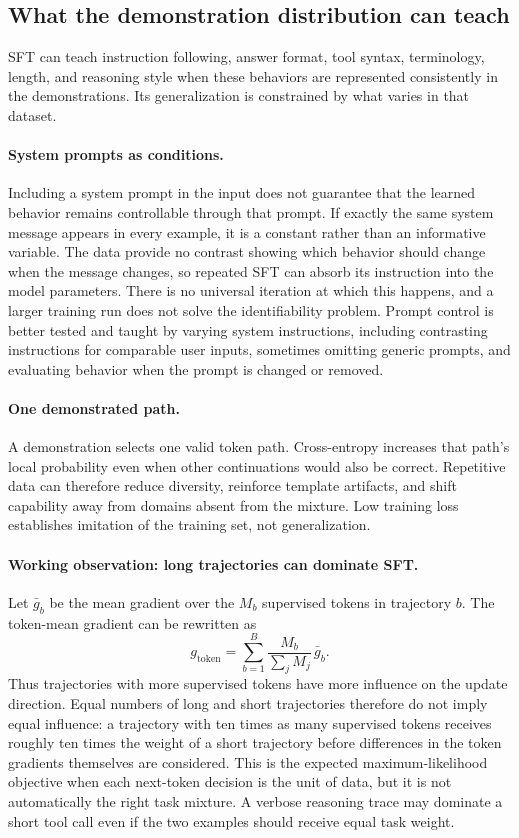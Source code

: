\subsection{What the demonstration distribution can teach}

SFT can teach instruction following, answer format, tool syntax, terminology, length, and
reasoning style when these behaviors are represented consistently in the demonstrations.
Its generalization is constrained by what varies in that dataset.

\paragraph{System prompts as conditions.}
Including a system prompt in the input does not guarantee that the learned behavior
remains controllable through that prompt. If exactly the same system message appears in
every example, it is a constant rather than an informative variable. The data provide no
contrast showing which behavior should change when the message changes, so repeated SFT
can absorb its instruction into the model parameters. There is no universal iteration at
which this happens, and a larger training run does not solve the identifiability problem.
Prompt control is better tested and taught by varying system instructions, including
contrasting instructions for comparable user inputs, sometimes omitting generic prompts,
and evaluating behavior when the prompt is changed or removed.

\paragraph{One demonstrated path.}
A demonstration selects one valid token path. Cross-entropy increases that path's local
probability even when other continuations would also be correct. Repetitive data can
therefore reduce diversity, reinforce template artifacts, and shift capability away from
domains absent from the mixture. Low training loss establishes imitation of the training
set, not generalization.

\paragraph{Working observation: long trajectories can dominate SFT.}
Let $\bar{g}_b$ be the mean gradient over the $M_b$ supervised tokens in trajectory $b$.
The token-mean gradient can be rewritten as
\begin{equation}
  g_{\mathrm{token}}
  =\sum_{b=1}^{B}\frac{M_b}{\sum_j M_j}\,\bar{g}_b.
\end{equation}
Thus trajectories with more supervised tokens have more influence on the update direction.
Equal numbers of long and short trajectories therefore do not imply equal influence: a
trajectory with ten times as many supervised tokens receives roughly ten times the weight
of a short trajectory before differences in the token gradients themselves are considered.
This is the expected maximum-likelihood objective when each next-token decision is the
unit of data, but it is not automatically the right task mixture. A verbose reasoning
trace may dominate a short tool call even if the two examples should receive equal task
weight.

